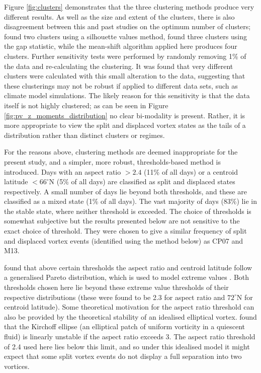 Figure \ref{fig:clusters} demonstrates that the three clustering methods produce
very different results. As well as the size and extent of the clusters, there is
also disagreement between this and past studies on the optimum number of
clusters; \citet{K.Coughlin2009} found two clusters using a silhouette values
method, \citet{Hannachi2010} found three clusters using the gap statistic, while
the mean-shift algorithm applied here produces four clusters. Further
sensitivity tests were performed by randomly removing 1\% of the data and
re-calculating the clustering. It was found that very different clusters were
calculated with this small alteration to the data, suggesting that these
clusterings may not be robust if applied to different data sets, such as climate
model simulations. The likely reason for this sensitivity is that the data
itself is not highly clustered; as can be seen in Figure
\ref{fig:pv_z_moments_distribution} no clear bi-modality is present. Rather, it
is more appropriate to view the split and displaced vortex states as the tails
of a distribution rather than distinct clusters or regimes. 

For the reasons above, clustering methods are deemed inappropriate for the
present study, and a simpler, more robust, thresholds-based method is
introduced. Days with an aspect ratio $>2.4$ (11\% of all days) or a centroid
latitude $<66^{\circ}$N (5\% of all days) are classified as split and displaced
states respectively. A small number of days lie beyond both thresholds, and
these are classified as a mixed state (1\% of all days). The vast majority of
days (83\%) lie in the stable state, where neither threshold is exceeded. The
choice of thresholds is somewhat subjective but the results presented below are
not sensitive to the exact choice of threshold. They were chosen to give a
similar frequency of split and displaced vortex events (identified using the
method below) as CP07 and M13. 

\citet{Mitchell2011} found that above certain thresholds the aspect ratio and
centroid latitude follow a generalised Pareto distribution, which is used to
model extreme values \citep{Cole}. Both thresholds chosen here lie beyond these
extreme value thresholds of their respective distributions (these were found to
be 2.3 for aspect ratio and $72^{\circ}$N for centroid latitude). Some
theoretical motivation for the aspect ratio threshold can also be provided by
the theoretical stability of an idealised elliptical vortex. \citet{Love1893}
found that the Kirchoff ellipse (an elliptical patch of uniform vorticity in a
quiescent fluid) is linearly unstable if the aspect ratio exceeds 3. The aspect
ratio threshold of 2.4 used here lies below this limit, and so under this
idealised model it might expect that some split vortex events do not display a
full separation into two vortices.

